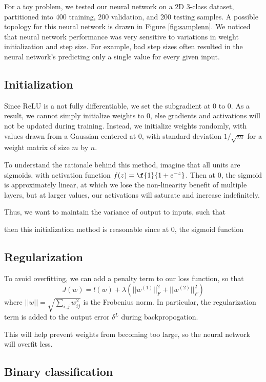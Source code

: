 \documentclass{article}
\begin{document}
\begin{multicols}{2}
For a toy problem, we tested our neural network on a 2D 3-class dataset, partitioned
into 400 training, 200 validation, and 200 testing samples.
A possible topology for this neural network is drawn in Figure \ref{fig:samplenn}.
We noticed that neural network  performance was very sensitive to 
variations in weight initialization and step size.
For example, bad step sizes often resulted in
the neural network's predicting only a single value for every given input.

\subsection{Initialization}

Since ReLU is a not fully differentiable, we set the subgradient at 0 to 0.
As a result, we cannot simply initialize weights to 0, else gradients and activations 
will not be updated during training. Instead, we initialize weights randomly,
with values drawn from a Gaussian centered at 0, with standard deviation $1/\sqrt{m}$
for a weight matrix of size $m$ by $n$.

To understand the rationale behind this method, imagine that all units are sigmoids,
with activation function $f(z) = \f{1}{1+e^{-z}}$. Then at 0, the sigmoid is approximately
linear, at which we lose the non-linearity benefit of multiple layers, but at larger values,
our activations will saturate and increase indefinitely.

Thus, we want to maintain the variance of output to inputs, such that 

then this initialization method is reasonable
since at 0, the sigmoid function  

\subsection{Regularization}

To avoid overfitting, we can add a penalty term to our loss function, so that
\begin{equation}
J(w) = l(w) + \lambda(||w^{(1)}||^2_F + ||w^{(2)}||^2_F)
\end{equation}
where $||w|| = \sqrt{\sum_{i,j}{w_{ij}^2}}$ is the Frobenius norm.
In particular, the regularization term is added to the output error $\delta^L$
during backpropogation.

This will help prevent weights from becoming too large, so the neural network will
overfit less.

\subsection{Binary classification}
\label{sec:binary}


\end{multicols}
\end{document}
